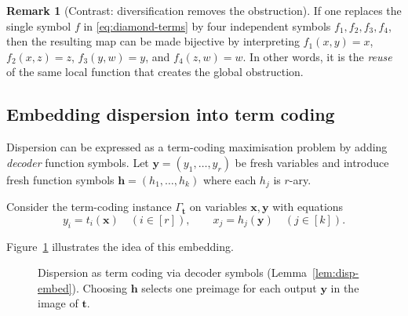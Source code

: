 \documentclass[11pt]{article}
\theoremstyle{definition}
\newtheorem{remark}{Remark}[section]
\theoremstyle{plain}
\newcommand{\A}{\mathsf{A}}
\begin{document}
\begin{remark}[Contrast: diversification removes the obstruction]
If one replaces the single symbol $f$ in \eqref{eq:diamond-terms} by four independent symbols
$f_{1},f_{2},f_{3},f_{4}$, then the resulting map can be made bijective by interpreting
$f_{1}(x,y)=x$, $f_{2}(x,z)=z$, $f_{3}(y,w)=y$, and $f_{4}(z,w)=w$.
In other words, it is the \emph{reuse} of the same local function that creates the global obstruction.
\end{remark}

\subsection{Embedding dispersion into term coding}
Dispersion can be expressed as a term-coding maximisation problem by adding \emph{decoder} function symbols.
Let $\mathbf y=(y_1,\dots,y_r)$ be fresh variables and introduce fresh function symbols
$\mathbf h=(h_1,\dots,h_k)$ where each $h_j$ is $r$-ary.

Consider the term-coding instance $\Gamma_{\mathbf t}$ on variables $\mathbf x,\mathbf y$ with equations
\begin{equation}
\label{eq:disp-to-tc}
y_i = t_i(\mathbf x)\quad (i\in[r]),
\qquad
x_j = h_j(\mathbf y)\quad (j\in[k]).
\end{equation}

Figure~\ref{fig:disp-embed} illustrates the idea of this embedding.


\begin{figure}[t]
\centering
{}
\caption{Dispersion as term coding via decoder symbols (Lemma~\ref{lem:disp-embed}).  Choosing $\mathbf h$ selects one preimage for each output $\mathbf y$ in the image of $\mathbf t$.}
\label{fig:disp-embed}
\end{figure}
\end{document}
